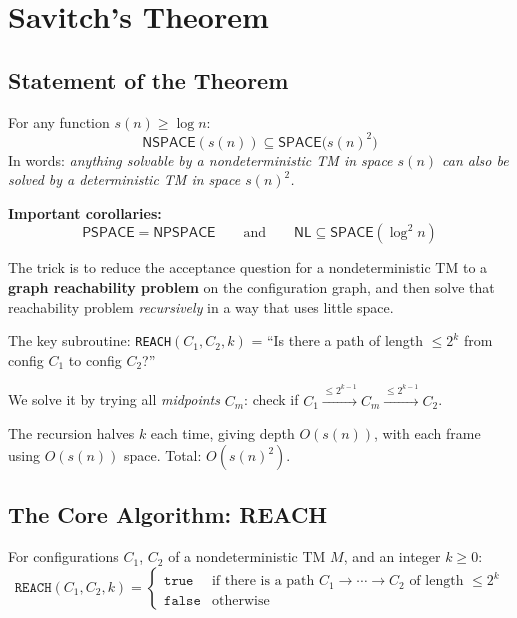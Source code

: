 \documentclass[12pt,a4paper]{article}
\theoremstyle{plain}
\theoremstyle{definition}
\theoremstyle{remark}
\newcommand{\SPACE}{\mathsf{SPACE}}
\newcommand{\NSPACE}{\mathsf{NSPACE}}
\newcommand{\PSPACE}{\mathsf{PSPACE}}
\newcommand{\NPSPACE}{\mathsf{NPSPACE}}
\newcommand{\NL}{\mathsf{NL}}
\begin{document}
\section{Savitch's Theorem}

\subsection{Statement of the Theorem}

\begin{theorembox}
For any function $s(n) \geq \log n$:
\[
  \boxed{\NSPACE(s(n)) \subseteq \SPACE\!\bigl(s(n)^2\bigr)}
\]
In words: \emph{anything solvable by a nondeterministic TM in space $s(n)$ can also be solved by a deterministic TM in space $s(n)^2$.}

\medskip
\textbf{Important corollaries:}
\[
  \PSPACE = \NPSPACE \qquad \text{and} \qquad \NL \subseteq \SPACE(\log^2 n)
\]
\end{theorembox}

\begin{intuitionbox}
The trick is to reduce the acceptance question for a nondeterministic TM to a \textbf{graph reachability problem} on the configuration graph, and then solve that reachability problem \emph{recursively} in a way that uses little space.

The key subroutine: \texttt{REACH}$(C_1, C_2, k)$ = ``Is there a path of length $\leq 2^k$ from config $C_1$ to config $C_2$?''

We solve it by trying all \emph{midpoints} $C_m$: check if $C_1 \xrightarrow{\leq 2^{k-1}} C_m \xrightarrow{\leq 2^{k-1}} C_2$.

The recursion halves $k$ each time, giving depth $O(s(n))$, with each frame using $O(s(n))$ space. Total: $O(s(n)^2)$.
\end{intuitionbox}

\subsection{The Core Algorithm: REACH}

\begin{definitionbox}
For configurations $C_1$, $C_2$ of a nondeterministic TM $M$, and an integer $k \geq 0$:
\[
  \texttt{REACH}(C_1, C_2, k) = \begin{cases}
    \texttt{true}  & \text{if there is a path } C_1 \to \cdots \to C_2 \text{ of length } \leq 2^k \\
    \texttt{false} & \text{otherwise}
  \end{cases}
\]
\end{definitionbox}
\end{document}
